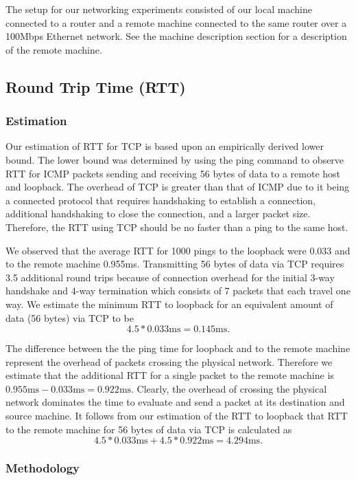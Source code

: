 The setup for our networking experiments consisted of our local machine
connected to a router and a remote machine connected to the same router over a
100Mbps Ethernet network. See the machine description section for a description
of the remote machine.

\subsection{Round Trip Time (RTT)}

\subsubsection{Estimation}

Our estimation of RTT for TCP is based upon an empirically derived lower bound.
The lower bound was determined by using the ping command to observe RTT for
ICMP packets sending and receiving 56 bytes of data to a remote host and
loopback. The overhead of TCP is greater than that of ICMP due to it being a
connected protocol that requires handshaking to establish a connection,
additional handshaking to close the connection, and a larger packet size.
Therefore, the RTT using TCP should be no faster than a ping to the same host. 

We observed that the average RTT for 1000 pings to the loopback were 0.033 and
to the remote machine 0.955ms. Transmitting 56 bytes of data via TCP requires
3.5 additional round trips because of connection overhead for the initial 3-way
handshake and 4-way termination which consists of 7 packets that each travel
one way.  We estimate the minimum RTT to loopback for an equivalent amount of
data (56 bytes) via TCP to be $$4.5 * 0.033\text{ms} = 0.145\text{ms}.$$  

The difference between the the ping time for loopback and to the remote machine
represent the overhead of packets crossing the physical network. Therefore we
estimate that the additional RTT for a single packet to the remote machine is
$0.955\text{ms} - 0.033\text{ms} = 0.922\text{ms}$. Clearly, the overhead of
crossing the physical network dominates the time to evaluate and send a packet
at its destination and source machine. It follows from our estimation of the
RTT to loopback that RTT to the remote machine for 56 bytes of data via TCP is
calculated as $$4.5 * 0.033\text{ms} + 4.5 * 0.922\text{ms} = 4.294\text{ms}.$$

\subsubsection{Methodology}

